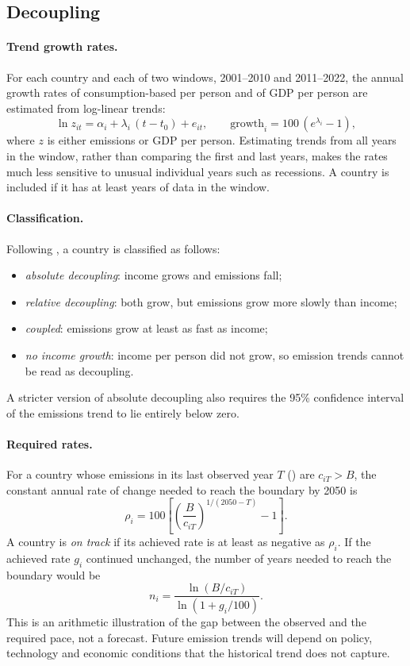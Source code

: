 \subsection{Decoupling}

\paragraph{Trend growth rates.} For each country and each of two windows, 2001--2010 and 2011--2022, the annual growth rates of consumption-based \COtwo{} per person and of GDP per person are estimated from log-linear trends:
\begin{equation}
\ln z_{it} = \alpha_i + \lambda_i\, (t - t_0) + e_{it}, \qquad \text{growth}_i = 100\,(e^{\lambda_i} - 1),
\end{equation}
where $z$ is either emissions or GDP per person. Estimating trends from all years in the window, rather than comparing the first and last years, makes the rates much less sensitive to unusual individual years such as recessions. A country is included if it has at least \nDecMinYears{} years of data in the window.

\paragraph{Classification.} Following \citet{haberl2020}, a country is classified as follows:
\begin{itemize}
\item \emph{absolute decoupling}: income grows and emissions fall;
\item \emph{relative decoupling}: both grow, but emissions grow more slowly than income;
\item \emph{coupled}: emissions grow at least as fast as income;
\item \emph{no income growth}: income per person did not grow, so emission trends cannot be read as decoupling.
\end{itemize}
A stricter version of absolute decoupling also requires the 95\% confidence interval of the emissions trend to lie entirely below zero.

\paragraph{Required rates.} For a country whose emissions in its last observed year $T$ (\nLastYear) are $c_{iT} > B$, the constant annual rate of change needed to reach the boundary by 2050 is
\begin{equation}
\rho_i = 100\left[\left(\frac{B}{c_{iT}}\right)^{1/(2050-T)} - 1\right].
\end{equation}
A country is \emph{on track} if its achieved rate is at least as negative as $\rho_i$. If the achieved rate $g_i$ continued unchanged, the number of years needed to reach the boundary would be
\begin{equation}
n_i = \frac{\ln (B / c_{iT})}{\ln(1 + g_i/100)}.
\end{equation}
This is an arithmetic illustration of the gap between the observed and the required pace, not a forecast. Future emission trends will depend on policy, technology and economic conditions that the historical trend does not capture.

